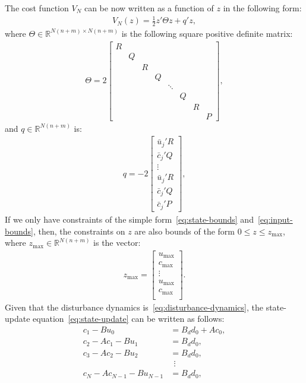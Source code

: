 \documentclass[12pt]{scrartcl}
\renewcommand{\Re}{\mathbb{R}}
\newcommand{\bcj}{\bar{c}_j}
\newcommand{\buj}{\bar{u}_j}
\begin{document}
The cost function $V_N$ can be now written as a function of $z$ in the following
form:
\begin{align}
V_N(z) = \frac{1}{2}z' \Theta z + q'z,
\end{align}
where $\Theta\in\Re^{N(n+m)\times N(n+m)}$ is the following square positive definite matrix:
\begin{align}
\Theta=2\left[
\begin{array}{cccccccc}
R\\
&Q\\
&&R\\
&&&Q\\
&&&&\ddots\\
&&&&&Q\\
&&&&&&R\\
&&&&&&&P
\end{array}\right],
\end{align}
and $q\in \Re^{N(n+m)}$ is:
\begin{align}
q=-2\left[
\begin{array}{c}
\buj' R\\
\bcj' Q\\
\vdots\\
\buj' R\\
\bcj' Q\\
\bcj' P
\end{array}\right],
\end{align}
If we only have constraints of the simple form~\eqref{eq:state-bounds} and~\eqref{eq:input-bounds},
then, the constraints on $z$ are also bounds of the form $0\leq z \leq z_{\max}$, where
$z_{\max}\in\Re^{N(n+m)}$ is the vector:
\begin{align}
z_{\max}=\left[
\begin{array}{c}
u_{\max}\\
c_{\max}\\
\vdots\\
u_{\max}\\
c_{\max}\\
\end{array}\right].
\end{align}
Given that the disturbance dynamics is~\eqref{eq:disturbance-dynamics}, the
state-update equation~\eqref{eq:state-update} can be written as follows:
\begin{align*}
c_1 - Bu_0 &= B_d d_0 + Ac_0,\\
c_2 - Ac_1 - Bu_1 &= B_d d_0,\\
c_3 - Ac_2 - Bu_2 &= B_d d_0,\\
&\ \ \vdots\\
c_N - Ac_{N-1}-Bu_{N-1} &= B_d d_0,
\end{align*}
\end{document}
